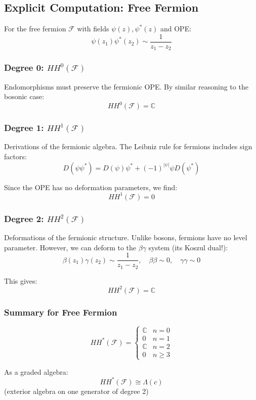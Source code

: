 \subsection{Explicit Computation: Free Fermion}

\begin{example}\label{ex:HH-fermion-complete}
For the free fermion $\mathcal{F}$ with fields $\psi(z), \psi^*(z)$ and OPE:
$$\psi(z_1)\psi^*(z_2) \sim \frac{1}{z_1 - z_2}$$

\subsubsection{Degree 0: $HH^0(\mathcal{F})$}

Endomorphisms must preserve the fermionic OPE. By similar reasoning to the bosonic case:
$$HH^0(\mathcal{F}) = \mathbb{C}$$

\subsubsection{Degree 1: $HH^1(\mathcal{F})$}

Derivations of the fermionic algebra. The Leibniz rule for fermions includes sign factors:
$$D(\psi \psi^*) = D(\psi)\psi^* + (-1)^{|\psi|} \psi D(\psi^*)$$

Since the OPE has no deformation parameters, we find:
$$HH^1(\mathcal{F}) = 0$$

\subsubsection{Degree 2: $HH^2(\mathcal{F})$}

Deformations of the fermionic structure. Unlike bosons, fermions have no level parameter.
However, we can deform to the $\beta\gamma$ system (its Koszul dual!):
$$\beta(z_1)\gamma(z_2) \sim \frac{1}{z_1 - z_2}, \quad \beta\beta \sim 0, \quad 
\gamma\gamma \sim 0$$

This gives:
$$HH^2(\mathcal{F}) = \mathbb{C}$$

\subsubsection{Summary for Free Fermion}

$$HH^*(\mathcal{F}) = \begin{cases}
\mathbb{C} & n = 0\\
0 & n = 1\\
\mathbb{C} & n = 2\\
0 & n \geq 3
\end{cases}$$

As a graded algebra:
$$HH^*(\mathcal{F}) \cong \Lambda(c)$$
(exterior algebra on one generator of degree 2)
\end{example}

